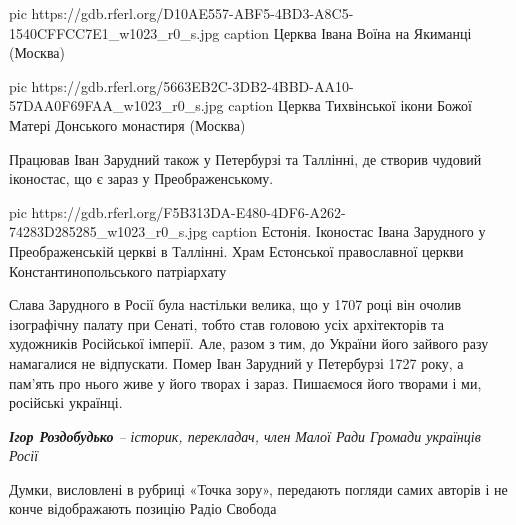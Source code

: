 \ifcmt
pic https://gdb.rferl.org/D10AE557-ABF5-4BD3-A8C5-1540CFFCC7E1_w1023_r0_s.jpg
caption Церква Івана Воїна на Якиманці (Москва)

pic https://gdb.rferl.org/5663EB2C-3DB2-4BBD-AA10-57DAA0F69FAA_w1023_r0_s.jpg
caption Церква Тихвінської ікони Божої Матері Донського монастиря (Москва)
\fi

Працював Іван Зарудний також у Петербурзі та Таллінні, де створив чудовий
іконостас, що є зараз у Преображенському.

\ifcmt
pic https://gdb.rferl.org/F5B313DA-E480-4DF6-A262-74283D285285_w1023_r0_s.jpg
caption Естонія. Іконостас Івана Зарудного у Преображенській церкві в Таллінні. Храм Естонської православної церкви Константинопольського патріархату
\fi

Слава Зарудного в Росії була настільки велика, що у 1707 році він очолив
ізографічну палату при Сенаті, тобто став головою усіх архітекторів та
художників Російської імперії. Але, разом з тим, до України його зайвого разу
намагалися не відпускати. Помер Іван Зарудний у Петербурзі 1727 року, а пам’ять
про нього живе у його творах і зараз. Пишаємося його творами і ми, російські
українці.

\begingroup
	\em
\textbf{Ігор Роздобудько} – історик, перекладач, член Малої Ради Громади українців Росії

Думки, висловлені в рубриці «Точка зору», передають погляди самих авторів і не
конче відображають позицію Радіо Свобода
\endgroup
